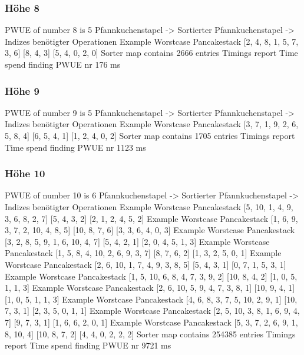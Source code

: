 {    \subsubsection{Höhe 8}

    PWUE of number 8 is 5
    Pfannkuchenstapel -> Sortierter Pfannkuchenstapel -> Indizes benötigter Operationen
Example Worstcase Pancakestack
    [2, 4, 8, 1, 5, 7, 3, 6]
    [8, 4, 3]
    [5, 4, 0, 2, 0]
    Sorter map contains 2666 entries
    Timings report
    Time spend finding PWUE nr 176 ms
    \subsubsection{Höhe 9}

    PWUE of number 9 is 5
    Pfannkuchenstapel -> Sortierter Pfannkuchenstapel -> Indizes benötigter Operationen
Example Worstcase Pancakestack
    [3, 7, 1, 9, 2, 6, 5, 8, 4]
    [6, 5, 4, 1]
    [1, 2, 4, 0, 2]
    Sorter map contains 1705 entries
    Timings report
    Time spend finding PWUE nr 1123 ms
    \subsubsection{Höhe 10}

    PWUE of number 10 is 6
    Pfannkuchenstapel -> Sortierter Pfannkuchenstapel -> Indizes benötigter Operationen
Example Worstcase Pancakestack
    [5, 10, 1, 4, 9, 3, 6, 8, 2, 7]
    [5, 4, 3, 2]
    [2, 1, 2, 4, 5, 2]
    Example Worstcase Pancakestack
    [1, 6, 9, 3, 7, 2, 10, 4, 8, 5]
    [10, 8, 7, 6]
    [3, 3, 6, 4, 0, 3]
    Example Worstcase Pancakestack
    [3, 2, 8, 5, 9, 1, 6, 10, 4, 7]
    [5, 4, 2, 1]
    [2, 0, 4, 5, 1, 3]
    Example Worstcase Pancakestack
    [1, 5, 8, 4, 10, 2, 6, 9, 3, 7]
    [8, 7, 6, 2]
    [1, 3, 2, 5, 0, 1]
    Example Worstcase Pancakestack
    [2, 6, 10, 1, 7, 4, 9, 3, 8, 5]
    [5, 4, 3, 1]
    [0, 7, 1, 5, 3, 1]
    Example Worstcase Pancakestack
    [1, 5, 10, 6, 8, 4, 7, 3, 9, 2]
    [10, 8, 4, 2]
    [1, 0, 5, 1, 1, 3]
    Example Worstcase Pancakestack
    [2, 6, 10, 5, 9, 4, 7, 3, 8, 1]
    [10, 9, 4, 1]
    [1, 0, 5, 1, 1, 3]
    Example Worstcase Pancakestack
    [4, 6, 8, 3, 7, 5, 10, 2, 9, 1]
    [10, 7, 3, 1]
    [2, 3, 5, 0, 1, 1]
    Example Worstcase Pancakestack
    [2, 5, 10, 3, 8, 1, 6, 9, 4, 7]
    [9, 7, 3, 1]
    [1, 6, 6, 2, 0, 1]
    Example Worstcase Pancakestack
    [5, 3, 7, 2, 6, 9, 1, 8, 10, 4]
    [10, 8, 7, 2]
    [4, 4, 0, 2, 2, 2]
    Sorter map contains 254385 entries
    Timings report
    Time spend finding PWUE nr 9721 ms
}
